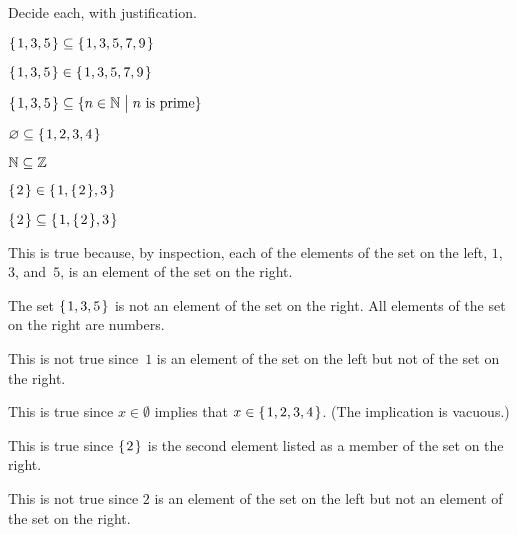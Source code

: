 \documentclass{test}  %
\begin{document}
\begin{problem} Decide each, with justification.
\begin{items}
\item $\mbox{$\{\hspace{0.1em}1,3,5\hspace{0.1em}\}$}\subseteq\mbox{$\{\hspace{0.1em}1,3, 5, 7, 9\hspace{0.1em}\}$}$
\item $\mbox{$\{\hspace{0.1em}1, 3, 5\hspace{0.1em}\}$}\in\mbox{$\{\hspace{0.1em}1, 3, 5, 7, 9\hspace{0.1em}\}$}$   
\item $\mbox{$\{\hspace{0.1em}1,3,5\hspace{0.1em}\}$}\subseteq\{n\in\mathbb{N} \bigm| \text{$n$ is prime}\}$
\item $\varnothing\subseteq\mbox{$\{\hspace{0.1em}1, 2, 3, 4\hspace{0.1em}\}$}$
\item $\mathbb{N}\subseteq\mathbb{Z}$
\item $\mbox{$\{\hspace{0.1em}2\hspace{0.1em}\}$}\in\mbox{$\{\hspace{0.1em}1, \mbox{$\{\hspace{0.1em}2\hspace{0.1em}\}$}, 3\hspace{0.1em}\}$}$
\item $\mbox{$\{\hspace{0.1em}2\hspace{0.1em}\}$}\subseteq\mbox{$\{\hspace{0.1em}1, \mbox{$\{\hspace{0.1em}2\hspace{0.1em}\}$}, 3\hspace{0.1em}\}$}$
\end{items}
\begin{answer}
\begin{items}
\item This is true because, by inspection, each of the elements of the set
  on the left, $1$, $3$, and~$5$, is an element of the set on the right.
\item The set $\mbox{$\{\hspace{0.1em}1,3,5\hspace{0.1em}\}$}$ is not an element of the set on the right.
  All elements of the set on the right are numbers.
\item This is not true since~$1$ is an element of the set on the left
  but not of the set on the right.
\item This is true since $x\in\emptyset$ implies that $x\in\mbox{$\{\hspace{0.1em}1, 2, 3, 4\hspace{0.1em}\}$}$. 
  (The implication is vacuous.)
\item This is true since $\mbox{$\{\hspace{0.1em}2\hspace{0.1em}\}$}$ is the second element listed as a
  member of the set on the right.
\item This is not true since $2$ is an element of the set on the left but
  not an element of the set on the right.
\end{items}
\end{answer}
\end{problem}
\end{document}
